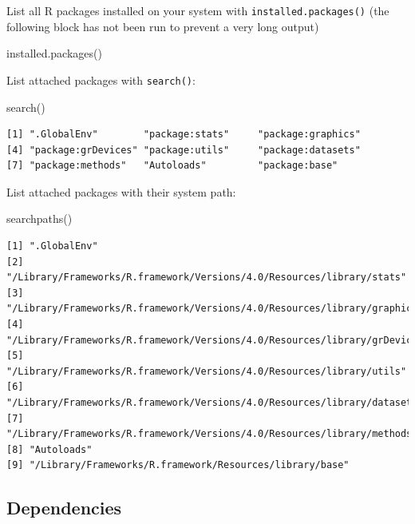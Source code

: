 \documentclass[
]{book}
\newenvironment{Shaded}{\begin{snugshade}}{\end{snugshade}}
\newcommand{\FunctionTok}[1]{\textcolor[rgb]{0.00,0.00,0.00}{#1}}
\newcommand{\NormalTok}[1]{#1}
\begin{document}
List all R packages installed on your system with \texttt{installed.packages()} (the following block has not been run to prevent a very long output)

\begin{Shaded}
\begin{Highlighting}[]
\FunctionTok{installed.packages}\NormalTok{()}
\end{Highlighting}
\end{Shaded}

List attached packages with \texttt{search()}:

\begin{Shaded}
\begin{Highlighting}[]
\FunctionTok{search}\NormalTok{()}
\end{Highlighting}
\end{Shaded}

\begin{verbatim}
[1] ".GlobalEnv"        "package:stats"     "package:graphics" 
[4] "package:grDevices" "package:utils"     "package:datasets" 
[7] "package:methods"   "Autoloads"         "package:base"     
\end{verbatim}

List attached packages with their system path:

\begin{Shaded}
\begin{Highlighting}[]
\FunctionTok{searchpaths}\NormalTok{()}
\end{Highlighting}
\end{Shaded}

\begin{verbatim}
[1] ".GlobalEnv"                                                              
[2] "/Library/Frameworks/R.framework/Versions/4.0/Resources/library/stats"    
[3] "/Library/Frameworks/R.framework/Versions/4.0/Resources/library/graphics" 
[4] "/Library/Frameworks/R.framework/Versions/4.0/Resources/library/grDevices"
[5] "/Library/Frameworks/R.framework/Versions/4.0/Resources/library/utils"    
[6] "/Library/Frameworks/R.framework/Versions/4.0/Resources/library/datasets" 
[7] "/Library/Frameworks/R.framework/Versions/4.0/Resources/library/methods"  
[8] "Autoloads"                                                               
[9] "/Library/Frameworks/R.framework/Resources/library/base"                  
\end{verbatim}

\hypertarget{dependencies}{%
\subsection{Dependencies}\label{dependencies}}
\end{document}

